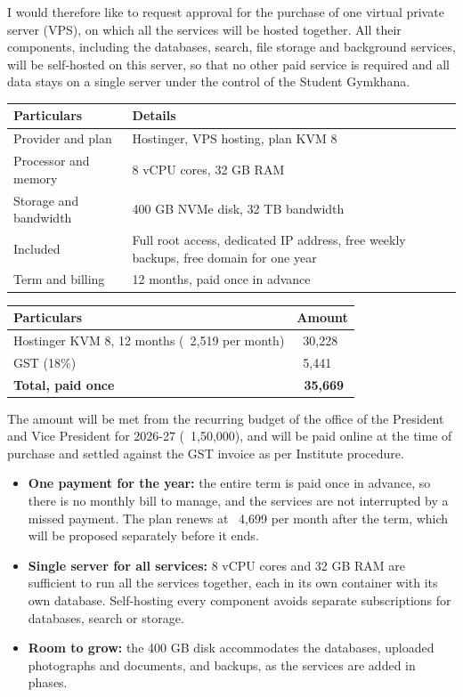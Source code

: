 \documentclass[11pt,letterpaper]{article}
\newcommand{\rs}{{\rupee}}
\newcommand{\subhead}[1]{\par\needspace{4\baselineskip}{\bfseries #1}\par\nopagebreak}
\begin{document}
I would therefore like to request approval for the purchase of one virtual private server (VPS), on which all the services will be hosted together. All their components, including the databases, search, file storage and background services, will be self-hosted on this server, so that no other paid service is required and all data stays on a single server under the control of the Student Gymkhana.

\subhead{Proposed server}
\begin{center}
\begin{tabular}{|L{4.6cm}|L{8.8cm}|}
\hline
\textbf{Particulars} & \textbf{Details} \\ \hline
Provider and plan & Hostinger, VPS hosting, plan KVM 8 \\ \hline
Processor and memory & 8 vCPU cores, 32 GB RAM \\ \hline
Storage and bandwidth & 400 GB NVMe disk, 32 TB bandwidth \\ \hline
Included & Full root access, dedicated IP address, free weekly backups, free domain for one year \\ \hline
Term and billing & 12 months, paid once in advance \\ \hline
\end{tabular}
\end{center}

\subhead{Cost}
\begin{center}
\begin{tabular}{|L{8.4cm}|R{2.8cm}|}
\hline
\textbf{Particulars} & \textbf{Amount} \\ \hline
Hostinger KVM 8, 12 months (\rs~2,519 per month) & \rs~30,228 \\ \hline
GST (18\%) & \rs~5,441 \\ \hline
\textbf{Total, paid once} & \textbf{\rs~35,669} \\ \hline
\end{tabular}
\end{center}
The amount will be met from the recurring budget of the office of the President and Vice President for 2026-27 (\rs~1,50,000), and will be paid online at the time of purchase and settled against the GST invoice as per Institute procedure.

\subhead{Justification}
\begin{itemize}
  \item \textbf{One payment for the year:} the entire term is paid once in advance, so there is no monthly bill to manage, and the services are not interrupted by a missed payment. The plan renews at \rs~4,699 per month after the term, which will be proposed separately before it ends.
  \item \textbf{Single server for all services:} 8 vCPU cores and 32 GB RAM are sufficient to run all the services together, each in its own container with its own database. Self-hosting every component avoids separate subscriptions for databases, search or storage.
  \item \textbf{Room to grow:} the 400 GB disk accommodates the databases, uploaded photographs and documents, and backups, as the services are added in phases.
\end{itemize}
\end{document}
